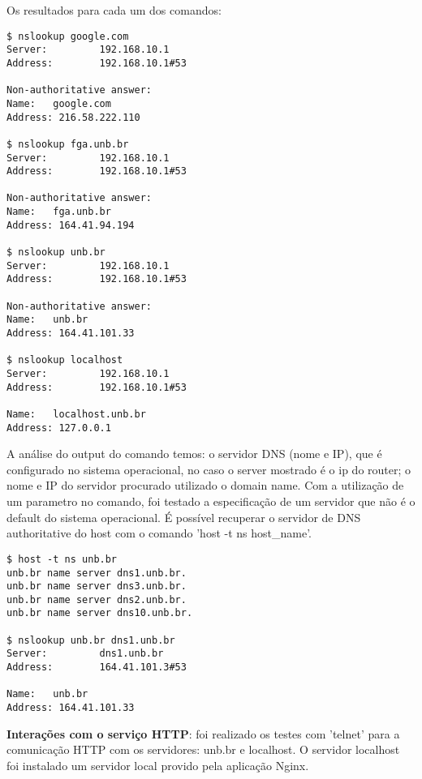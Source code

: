 Os resultados para cada um dos comandos:
\lstset{style=basic}
\begin{lstlisting}
$ nslookup google.com
Server:         192.168.10.1
Address:        192.168.10.1#53

Non-authoritative answer:
Name:   google.com
Address: 216.58.222.110

$ nslookup fga.unb.br
Server:         192.168.10.1
Address:        192.168.10.1#53

Non-authoritative answer:
Name:   fga.unb.br
Address: 164.41.94.194

$ nslookup unb.br
Server:         192.168.10.1
Address:        192.168.10.1#53

Non-authoritative answer:
Name:   unb.br
Address: 164.41.101.33

$ nslookup localhost
Server:         192.168.10.1
Address:        192.168.10.1#53

Name:   localhost.unb.br
Address: 127.0.0.1
\end{lstlisting}
\bigbreak
A análise do output do comando temos: o servidor DNS (nome e IP), que é configurado no sistema operacional, no caso
o server mostrado é o ip do router; o nome e IP do servidor procurado utilizado o domain name.
Com a utilização de um parametro no comando, foi testado a especificação de um servidor que não é o
default do sistema operacional. É possível recuperar o servidor de DNS authoritative do host com o comando
'host -t ns host\_name'.
\bigbreak
\lstset{style=basic}
\begin{lstlisting}
$ host -t ns unb.br
unb.br name server dns1.unb.br.
unb.br name server dns3.unb.br.
unb.br name server dns2.unb.br.
unb.br name server dns10.unb.br.

$ nslookup unb.br dns1.unb.br
Server:         dns1.unb.br
Address:        164.41.101.3#53

Name:   unb.br
Address: 164.41.101.33

\end{lstlisting}

\bigbreak
\textbf{Interações com o serviço HTTP}: foi realizado os testes com 'telnet' para a comunicação
HTTP com os servidores: unb.br e localhost. O servidor localhost foi instalado um servidor
local provido pela aplicação Nginx.

